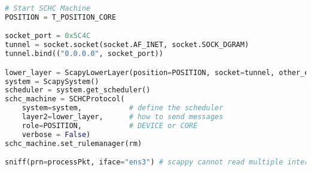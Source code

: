 \begin{lstlisting}[language=Python, caption={Program ping\_core2.py}, label=prog-ping-core2, basicstyle=\ttfamily\scriptsize]
# Start SCHC Machine
POSITION = T_POSITION_CORE

socket_port = 0x5C4C
tunnel = socket.socket(socket.AF_INET, socket.SOCK_DGRAM)
tunnel.bind(("0.0.0.0", socket_port))

lower_layer = ScapyLowerLayer(position=POSITION, socket=tunnel, other_end=None)
system = ScapySystem()
scheduler = system.get_scheduler()
schc_machine = SCHCProtocol(
    system=system,           # define the scheduler
    layer2=lower_layer,      # how to send messages
    role=POSITION,           # DEVICE or CORE
    verbose = False)         
schc_machine.set_rulemanager(rm)

sniff(prn=processPkt, iface="ens3") # scappy cannot read multiple interfaces
\end{lstlisting}